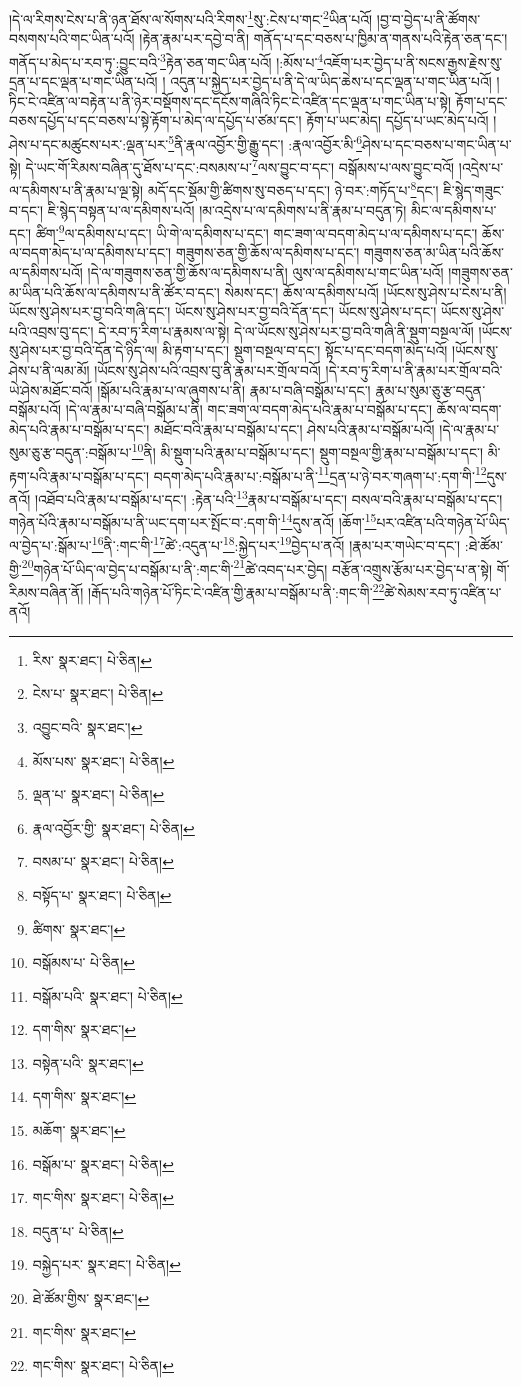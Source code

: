 །དེ་ལ་རིགས་ངེས་པ་ནི་ཉན་ཐོས་ལ་སོགས་པའི་རིགས་\footnote{རིས་  སྣར་ཐང་།  པེ་ཅིན། }སུ་:ངེས་པ་གང་\footnote{ངེས་པ་  སྣར་ཐང་།  པེ་ཅིན། }ཡིན་པའོ། །བྱ་བ་བྱེད་པ་ནི་ཚོགས་བསགས་པའི་གང་ཡིན་པའོ། །རྟེན་རྣམ་པར་དབྱེ་བ་ནི། གནོད་པ་དང་བཅས་པ་ཁྱིམ་ན་གནས་པའི་རྟེན་ཅན་དང་། གནོད་པ་མེད་པ་རབ་ཏུ་:བྱུང་བའི་\footnote{འབྱུང་བའི་  སྣར་ཐང་། }རྟེན་ཅན་གང་ཡིན་པའོ། །:མོས་པ་\footnote{མོས་པས་  སྣར་ཐང་།  པེ་ཅིན། }འཇོག་པར་བྱེད་པ་ནི་སངས་རྒྱས་རྗེས་སུ་དྲན་པ་དང་ལྡན་པ་གང་ཡིན་པའོ། །
འདུན་པ་སྐྱེད་པར་བྱེད་པ་ནི་དེ་ལ་ཡིད་ཆེས་པ་དང་ལྡན་པ་གང་ཡིན་པའོ། །ཏིང་ངེ་འཛིན་ལ་བརྟེན་པ་ནི་ཉེར་བསྡོགས་དང་དངོས་གཞིའི་ཏིང་ངེ་འཛིན་དང་ལྡན་པ་གང་ཡིན་པ་སྟེ། རྟོག་པ་དང་བཅས་དཔྱོད་པ་དང་བཅས་པ་སྟེ་རྟོག་པ་མེད་ལ་དཔྱོད་པ་ཙམ་དང་། རྟོག་པ་ཡང་མེད། དཔྱོད་པ་ཡང་མེད་པའོ། །ཤེས་པ་དང་མཚུངས་པར་:ལྡན་པར་\footnote{ལྡན་པ་  སྣར་ཐང་།  པེ་ཅིན། }ནི་རྣལ་འབྱོར་གྱི་རྒྱུ་དང་། :རྣལ་འབྱོར་མི་\footnote{རྣལ་འབྱོར་གྱི་  སྣར་ཐང་།  པེ་ཅིན། }ཤེས་པ་དང་བཅས་པ་གང་ཡིན་པ་སྟེ། དེ་ཡང་གོ་རིམས་བཞིན་དུ་ཐོས་པ་དང་:བསམས་པ་\footnote{བསམ་པ་  སྣར་ཐང་།  པེ་ཅིན། }ལས་བྱུང་བ་དང་། བསྒོམས་པ་ལས་བྱུང་བའོ། །འདྲེས་པ་ལ་དམིགས་པ་ནི་རྣམ་པ་ལྔ་སྟེ། མདོ་དང་སྡོམ་གྱི་ཚིགས་སུ་བཅད་པ་དང་། ཉེ་བར་:གཏོད་པ་\footnote{བསྟོད་པ་  སྣར་ཐང་།  པེ་ཅིན། }དང་། ཇི་སྙེད་གཟུང་བ་དང་། ཇི་སྙེད་བསྟན་པ་ལ་དམིགས་པའོ། །མ་འདྲེས་པ་ལ་དམིགས་པ་ནི་རྣམ་པ་བདུན་ཏེ། མིང་ལ་དམིགས་པ་དང་། ཚིག་\footnote{ཚིགས་  སྣར་ཐང་། }ལ་དམིགས་པ་དང་། ཡི་གེ་ལ་དམིགས་པ་དང་། གང་ཟག་ལ་བདག་མེད་པ་ལ་དམིགས་པ་དང་། ཆོས་ལ་བདག་མེད་པ་ལ་དམིགས་པ་དང་། གཟུགས་ཅན་གྱི་ཆོས་ལ་དམིགས་པ་དང་། གཟུགས་ཅན་མ་ཡིན་པའི་ཆོས་ལ་དམིགས་པའོ། །དེ་ལ་གཟུགས་ཅན་གྱི་ཆོས་ལ་དམིགས་པ་ནི། ལུས་ལ་དམིགས་པ་གང་ཡིན་པའོ། །གཟུགས་ཅན་མ་ཡིན་པའི་ཆོས་ལ་དམིགས་པ་ནི་ཚོར་བ་དང་། སེམས་དང་། ཆོས་ལ་དམིགས་པའོ། །ཡོངས་སུ་ཤེས་པ་ངེས་པ་ནི། ཡོངས་སུ་ཤེས་པར་བྱ་བའི་གཞི་དང་། ཡོངས་སུ་ཤེས་པར་བྱ་བའི་དོན་དང་། ཡོངས་སུ་ཤེས་པ་དང་། ཡོངས་སུ་ཤེས་པའི་འབྲས་བུ་དང་། དེ་རབ་ཏུ་རིག་པ་རྣམས་ལ་སྟེ། དེ་ལ་ཡོངས་སུ་ཤེས་པར་བྱ་བའི་གཞི་ནི་སྡུག་བསྔལ་ལོ། །ཡོངས་སུ་ཤེས་པར་བྱ་བའི་དོན་དེ་ཉིད་ལ། མི་རྟག་པ་དང་། སྡུག་བསྔལ་བ་དང་། སྟོང་པ་དང་བདག་མེད་པའོ། །ཡོངས་སུ་ཤེས་པ་ནི་ལམ་མོ། །ཡོངས་སུ་ཤེས་པའི་འབྲས་བུ་ནི་རྣམ་པར་གྲོལ་བའོ། །དེ་རབ་ཏུ་རིག་པ་ནི་རྣམ་པར་གྲོལ་བའི་ཡེ་ཤེས་མཐོང་བའོ། །སྒོམ་པའི་རྣམ་པ་ལ་ཞུགས་པ་ནི། རྣམ་པ་བཞི་བསྒོམ་པ་དང་། རྣམ་པ་སུམ་ཅུ་རྩ་བདུན་བསྒོམ་པའོ། །དེ་ལ་རྣམ་པ་བཞི་བསྒོམ་པ་ནི། གང་ཟག་ལ་བདག་མེད་པའི་རྣམ་པ་བསྒོམ་པ་དང་། ཆོས་ལ་བདག་མེད་པའི་རྣམ་པ་བསྒོམ་པ་དང་། མཐོང་བའི་རྣམ་པ་བསྒོམ་པ་དང་། ཤེས་པའི་རྣམ་པ་བསྒོམ་པའོ། །དེ་ལ་རྣམ་པ་སུམ་ཅུ་རྩ་བདུན་:བསྒོམ་པ་\footnote{བསྒོམས་པ་  པེ་ཅིན། }ནི། མི་སྡུག་པའི་རྣམ་པ་བསྒོམ་པ་དང་། སྡུག་བསྔལ་གྱི་རྣམ་པ་བསྒོམ་པ་དང་། མི་རྟག་པའི་རྣམ་པ་བསྒོམ་པ་དང་། བདག་མེད་པའི་རྣམ་པ་:བསྒོམ་པ་ནི་\footnote{བསྒོམ་པའི་  སྣར་ཐང་།  པེ་ཅིན། }དྲན་པ་ཉེ་བར་གཞག་པ་:དག་གི་\footnote{དག་གིས་  སྣར་ཐང་། }དུས་ནའོ། །འཐོབ་པའི་རྣམ་པ་བསྒོམ་པ་དང་། :རྟེན་པའི་\footnote{བསྟེན་པའི་  སྣར་ཐང་། }རྣམ་པ་བསྒོམ་པ་དང་། བསལ་བའི་རྣམ་པ་བསྒོམ་པ་དང་། གཉེན་པོའི་རྣམ་པ་བསྒོམ་པ་ནི་ཡང་དག་པར་སྤོང་བ་:དག་གི་\footnote{དག་གིས་  སྣར་ཐང་། }དུས་ནའོ། །ཆོག་\footnote{མཆོག་  སྣར་ཐང་། }པར་འཛིན་པའི་གཉེན་པོ་ཡིད་ལ་བྱེད་པ་:སྒོམ་པ་\footnote{བསྒོམ་པ་  སྣར་ཐང་།  པེ་ཅིན། }ནི་:གང་གི་\footnote{གང་གིས་  སྣར་ཐང་།  པེ་ཅིན། }ཚེ་:འདུན་པ་\footnote{བདུན་པ་  པེ་ཅིན། }:སྐྱེད་པར་\footnote{བསྐྱེད་པར་  སྣར་ཐང་།  པེ་ཅིན། }བྱེད་པ་ནའོ། །རྣམ་པར་གཡེང་བ་དང་། :ཐེ་ཚོམ་གྱི་\footnote{ཐེ་ཚོམ་གྱིས་  སྣར་ཐང་། }གཉེན་པོ་ཡིད་ལ་བྱེད་པ་བསྒོམ་པ་ནི་:གང་གི་\footnote{གང་གིས་  སྣར་ཐང་། }ཚེ་འབད་པར་བྱེད། བརྩོན་འགྲུས་རྩོམ་པར་བྱེད་པ་ན་སྟེ། གོ་རིམས་བཞིན་ནོ། །རྒོད་པའི་གཉེན་པོ་ཏིང་ངེ་འཛིན་གྱི་རྣམ་པ་བསྒོམ་པ་ནི་:གང་གི་\footnote{གང་གིས་  སྣར་ཐང་།  པེ་ཅིན། }ཚེ་སེམས་རབ་ཏུ་འཛིན་པ་ནའོ། 